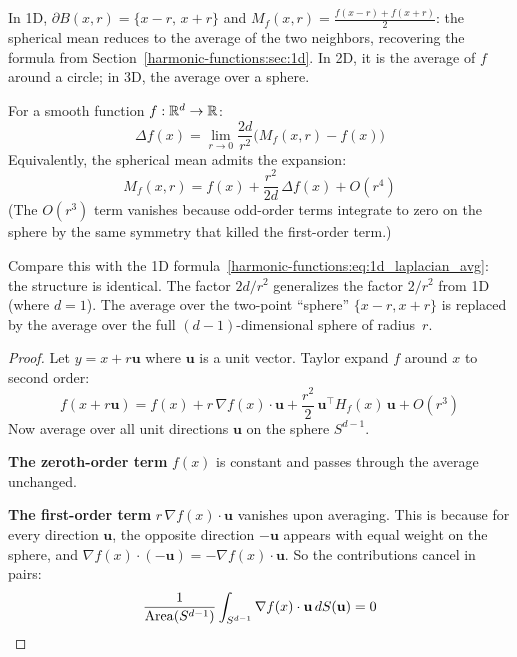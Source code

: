 \begin{notechapter}
In 1D, $\partial B(x,r) = \{x-r,\, x+r\}$ and
$M_f(x,r) = \frac{f(x-r) + f(x+r)}{2}$: the spherical mean reduces to
the average of the two neighbors, recovering the formula from
Section~\ref{harmonic-functions:sec:1d}. In 2D, it is the average of $f$ around a circle; in
3D, the average over a sphere.

\begin{theorem}
\label{harmonic-functions:thm:laplacian_average}
For a smooth function $f: \mathbb{R}^d \to \mathbb{R}$:
\begin{equation}
\label{harmonic-functions:eq:laplacian_avg}
\boxed{\Delta f(x) = \lim_{r \to 0} \frac{2d}{r^2}
  \bigl(M_f(x,r) - f(x)\bigr)}
\end{equation}
Equivalently, the spherical mean admits the expansion:
\begin{equation}
\label{harmonic-functions:eq:spherical_mean_expansion}
M_f(x,r) = f(x) + \frac{r^2}{2d}\,\Delta f(x) + O(r^4)
\end{equation}
(The $O(r^3)$ term vanishes because odd-order terms integrate to zero on
the sphere by the same symmetry that killed the first-order term.)
\end{theorem}

Compare this with the 1D formula~\eqref{harmonic-functions:eq:1d_laplacian_avg}: the structure
is identical. The factor $2d/r^2$ generalizes the factor $2/r^2$ from 1D
(where $d = 1$). The average over the two-point ``sphere'' $\{x-r, x+r\}$
is replaced by the average over the full $(d-1)$-dimensional sphere of
radius~$r$.

\begin{proof}
Let $y = x + r\mathbf{u}$ where $\mathbf{u}$ is a unit vector. Taylor expand
$f$ around $x$ to second order:
\begin{equation}
f(x + r\mathbf{u}) = f(x) + r\,\nabla f(x) \cdot \mathbf{u}
  + \frac{r^2}{2}\,\mathbf{u}^\top H_f(x)\,\mathbf{u} + O(r^3)
\end{equation}
Now average over all unit directions $\mathbf{u}$ on the sphere $S^{d-1}$.

\textbf{The zeroth-order term} $f(x)$ is constant and passes through the
average unchanged.

\textbf{The first-order term} $r\,\nabla f(x) \cdot \mathbf{u}$ vanishes
upon averaging. This is because for every direction $\mathbf{u}$, the
opposite direction $-\mathbf{u}$ appears with equal weight on the sphere,
and $\nabla f(x) \cdot (-\mathbf{u}) = -\nabla f(x) \cdot \mathbf{u}$. So
the contributions cancel in pairs:
\[
\frac{1}{\operatorname{Area}(S^{d-1})} \int_{S^{d-1}}
  \nabla f(x) \cdot \mathbf{u}\,dS(\mathbf{u}) = 0
\]


\end{proof}
\end{notechapter}
